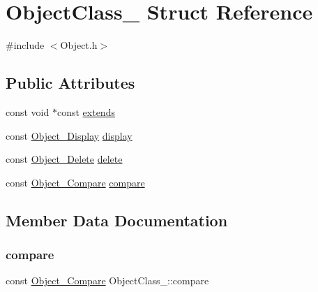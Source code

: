 \hypertarget{structObjectClass__}{}\section{Object\+Class\+\_\+ Struct Reference}
\label{structObjectClass__}


{\ttfamily \#include $<$Object.\+h$>$}

\subsection*{Public Attributes}
\begin{DoxyCompactItemize}
\item 
const void $\ast$const \hyperlink{structObjectClass___ae808ab38820193b96ce3d0ca7f801881}{extends}
\item 
const \hyperlink{Object_8h_a7f3c8c316adfe192cfd6068872ea0682}{Object\+\_\+\+Display} \hyperlink{structObjectClass___a1705a95c924885d3482bf9ba9e5617f4}{display}
\item 
const \hyperlink{Object_8h_ad4d12b504fef15e113a3e939f5afa7fe}{Object\+\_\+\+Delete} \hyperlink{structObjectClass___a05705e5051e96442f088a3c92fae4521}{delete}
\item 
const \hyperlink{Object_8h_ac4e48c8d5aa251cd359de30d13cd26f4}{Object\+\_\+\+Compare} \hyperlink{structObjectClass___a2ca8d2266f77ddd519e7c850e9b78e79}{compare}
\end{DoxyCompactItemize}


\subsection{Member Data Documentation}
\mbox{\label{structObjectClass___a2ca8d2266f77ddd519e7c850e9b78e79}} 
\subsubsection{\texorpdfstring{compare}{compare}}
{\footnotesize\ttfamily const \hyperlink{Object_8h_ac4e48c8d5aa251cd359de30d13cd26f4}{Object\+\_\+\+Compare} Object\+Class\+\_\+\+::compare}

\mbox{\label{structObjectClass___a05705e5051e96442f088a3c92fae4521}} 
